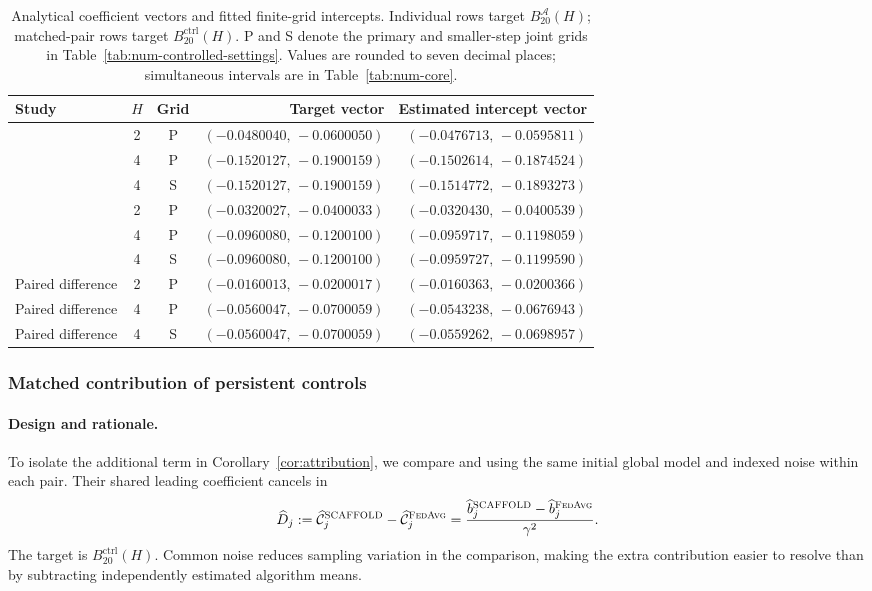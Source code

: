 \begin{table}[!htbp]
\centering\small
\setlength{\tabcolsep}{3pt}
\caption{Analytical coefficient vectors and fitted finite-grid intercepts.
Individual rows target $B_{20}^{\mathcal A}(H)$; matched-pair rows target
$B_{20}^{\mathrm{ctrl}}(H)$. P and S denote the primary and smaller-step
joint grids in Table~\ref{tab:num-controlled-settings}. Values are rounded
to seven decimal places; simultaneous intervals are in
Table~\ref{tab:num-core}.}
\label{tab:num-attribution-summary}
\begin{tabular}{@{}lccrr@{}}
\toprule
Study & $H$ & Grid & Target vector & Estimated intercept vector \\
\midrule
\Scaf{} & 2 & P & $(-0.0480040,\,-0.0600050)$ & $(-0.0476713,\,-0.0595811)$ \\
\Scaf{} & 4 & P & $(-0.1520127,\,-0.1900159)$ & $(-0.1502614,\,-0.1874524)$ \\
\Scaf{} & 4 & S & $(-0.1520127,\,-0.1900159)$ & $(-0.1514772,\,-0.1893273)$ \\
\addlinespace
\FedAvg{} & 2 & P & $(-0.0320027,\,-0.0400033)$ & $(-0.0320430,\,-0.0400539)$ \\
\FedAvg{} & 4 & P & $(-0.0960080,\,-0.1200100)$ & $(-0.0959717,\,-0.1198059)$ \\
\FedAvg{} & 4 & S & $(-0.0960080,\,-0.1200100)$ & $(-0.0959727,\,-0.1199590)$ \\
\addlinespace
Paired difference & 2 & P & $(-0.0160013,\,-0.0200017)$ & $(-0.0160363,\,-0.0200366)$ \\
Paired difference & 4 & P & $(-0.0560047,\,-0.0700059)$ & $(-0.0543238,\,-0.0676943)$ \\
Paired difference & 4 & S & $(-0.0560047,\,-0.0700059)$ & $(-0.0559262,\,-0.0698957)$ \\
\bottomrule
\end{tabular}
\end{table}

\subsubsection{Matched contribution of persistent controls}
\label{sec:num-attribution}

\paragraph{Design and rationale.}
To isolate the additional term in Corollary~\ref{cor:attribution},
we compare \Scaf{} and \FedAvg{} using the same initial global model
and indexed noise within each pair. Their shared leading coefficient
cancels in
\begin{equation}
\label{eq:num-D}
\widehat D_j
:=\widehat{\mathcal C}^{\textnormal{\textsc{SCAFFOLD}}}_j-\widehat{\mathcal C}^{\textnormal{\textsc{FedAvg}}}_j
=\frac{\widehat b_j^{\textnormal{\textsc{SCAFFOLD}}}-\widehat b_j^{\textnormal{\textsc{FedAvg}}}}{\gamma^2}.
\end{equation}
The target is $B_{20}^{\mathrm{ctrl}}(H)$. Common noise reduces sampling
variation in the comparison, making the extra contribution easier to
resolve than by subtracting independently estimated algorithm means.

